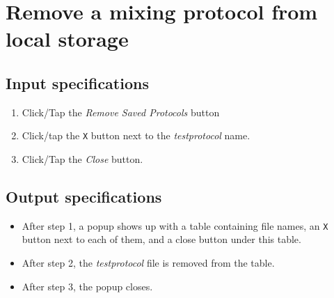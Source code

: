 \section{Remove a mixing protocol from local storage}

\subsection*{Input specifications}
\begin{enumerate}
\item Click/Tap the \emph{Remove Saved Protocols} button
\item Click/tap the \texttt{X} button next to the \emph{testprotocol} name.
\item Click/Tap the \emph{Close} button.
\end{enumerate}

\subsection*{Output specifications}
\begin{itemize}
\item After step 1, a popup shows up with a table containing file names, an \texttt{X} button next to each of them, and a close button under this table.
\item After step 2, the \emph{testprotocol} file is removed from the table.
\item After step 3, the popup closes.
\end{itemize}